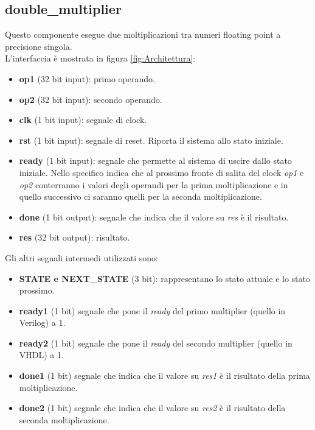 \documentclass[]{IEEEtran}
\begin{document}
\subsection{double\_multiplier}
Questo componente esegue due moltiplicazioni tra numeri floating point a precisione singola.
\\L'interfaccia è mostrata in figura \ref{fig:Architettura}:
\begin{itemize}
    \item \textbf{op1} (32 bit input): primo operando.
    \item \textbf{op2} (32 bit input): secondo operando.
    \item \textbf{clk} (1 bit input): segnale di clock.
    \item \textbf{rst} (1 bit input): segnale di reset. Riporta il sistema allo stato iniziale.
    \item \textbf{ready} (1 bit input): segnale che permette al sistema di uscire dallo stato iniziale. Nello specifico indica che al prossimo fronte di salita del clock \textit{op1} e \textit{op2} conterranno i valori degli operandi per la prima moltiplicazione e in quello successivo ci saranno quelli per la seconda moltiplicazione.
    \item \textbf{done} (1 bit output): segnale che indica che il valore su \textit{res} è il risultato.
    \item \textbf{res} (32 bit output): risultato.
\end{itemize}

Gli altri segnali intermedi utilizzati sono:
\begin{itemize}
    \item \textbf{STATE e NEXT\_STATE} (3 bit): rappresentano lo stato attuale e lo stato prossimo.
    \item \textbf{ready1} (1 bit) segnale che pone il \textit{ready} del primo multiplier (quello in Verilog) a 1.
    \item \textbf{ready2} (1 bit) segnale che pone il \textit{ready} del secondo multiplier (quello in VHDL) a 1.
    \item \textbf{done1} (1 bit) segnale che indica che il valore su \textit{res1} è il risultato della prima moltiplicazione.
    \item \textbf{done2} (1 bit) segnale che indica che il valore su \textit{res2} è il risultato della seconda moltiplicazione.
\end{itemize}
\end{document}

